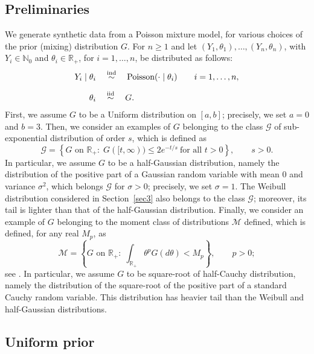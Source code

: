 \documentclass[twoside,12pt]{article}
\def\simind{\stackrel{\mbox{\scriptsize{ind}}}{\sim}}
\def\simiid{\stackrel{\mbox{\scriptsize{iid}}}{\sim}}
\begin{document}
\subsection{Preliminaries}
We generate synthetic data from a Poisson mixture model, for various choices of the prior (mixing) distribution $G$. For $n\geq1$ and let $(Y_{1},\theta_{1}),\ldots,(Y_{n},\theta_{n})$, with $Y_{i}\in\mathbb{N}_{0}$ and $\theta_{i}\in\mathbb{R}_{+}$, for $i=1,\ldots,n$, be distributed as follows:
\begin{equation}\label{eq:mixture_model_poisson}
\begin{aligned}
Y_i \mid \theta_i &\quad \simind \quad \text{Poisson}(\cdot \mid \theta_i) \qquad i=1,\ldots,n,\\[0.2cm]
\theta_i &\quad \simiid \quad G.
\end{aligned}
\end{equation}
First, we assume $G$ to be a Uniform distribution on $[a,b]$; precisely, we set $a=0$ and $b=3$. Then, we consider an examples of $G$ belonging to the class $\mathcal{G}$ of sub-exponential distribution of order $s$, which is defined as
\begin{displaymath}
\mathcal{G}=\left\{G\text{ on }\mathbb{R}_{+}:\;G([t,\infty)) \leq 2e^{-t/s}\ \text{for all } t>0\right\},\qquad s>0.
\end{displaymath}
In particular, we assume $G$ to be a half-Gaussian distribution, namely the distribution of the positive part of a Gaussian random variable with mean $0$ and variance $\sigma^{2}$, which belongs $\mathcal{G}$ for $\sigma>0$; precisely, we set $\sigma=1$. The Weibull distribution considered in Section~\ref{sec3} also belongs to the class $\mathcal G$; moreover, its tail is lighter than that of the half-Gaussian distribution. Finally, we consider an example of $G$ belonging to the moment class of distributions $\mathcal{M}$ defined, which is defined, for any real $M_{p}$, as
\begin{displaymath}
\mathcal{M}=\left\{G\text{ on }\mathbb{R}_{+}:\;\int_{\mathbb{R}_{+}}\theta^{p} G(d\theta)<M_{p}\right\},\qquad p>0;
\end{displaymath}
see \citet[Section 1]{She(24)}. In particular, we assume $G$ to be square-root of half-Cauchy distribution, namely the distribution of the square-root of the positive part of a standard Cauchy random variable. This distribution has heavier tail than the Weibull and half-Gaussian distributions.


\subsection{Uniform prior}
\end{document}
